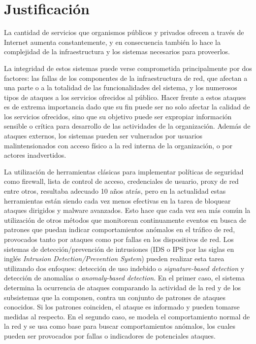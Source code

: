 \section*{Justificación}
La cantidad de servicios que organismos públicos y privados ofrecen a través de Internet aumenta constantemente, y en consecuencia también lo hace la complejidad de la infraestructura y los sistemas necesarios para proveerlos. \par
La integridad de estos sistemas puede verse comprometida principalmente por dos factores: las fallas de los componentes de la infraestructura de red\cite{Gill:2011:UNF:2043164.2018477}, que afectan a una parte o a la totalidad de las funcionalidades del sistema, y los numerosos tipos de ataques\cite{Karumanchi:2014:WLS:2554850.2555010}\cite{mutchler15:mobilewebapps} a los servicios ofrecidos al público. Hacer frente a estos ataques es de extrema importancia dado que su fin puede ser no solo afectar la calidad de los servicios ofrecidos, sino que su objetivo puede ser expropiar información sensible o crítica para desarrollo de las actividades de la organización. Además de ataques externos, los sistemas pueden ser vulnerados por usuarios malintensionados con acceso físico a la red interna de la organización, o por actores inadvertidos\cite{Kraemer2007143}\cite{Kraemer2009509}\cite{Liginlal2009215}\cite{Ahmed12humanerrors}. \par
La utilización de herramientas clásicas para implementar políticas de seguridad como firewall, lista de control de acceso, credenciales de usuario, proxy de red entre otros, resultaba adecuado 10 años atrás, pero en la actualidad estas herramientas están siendo cada vez menos efectivas en la tarea de bloquear ataques dirigidos y malware avanzados. Esto hace que cada vez sea más común la utilización de otros métodos que monitorean continuamente eventos en busca de patrones que puedan indicar comportamientos anómalos en el tráfico de red, provocados tanto por ataques como por fallas en los dispositivos de red. Los sistemas de detección/prevención de intrusiones (IDS o IPS por las siglas en inglés \textit{Intrusion Detection/Prevention System}) pueden realizar esta tarea utilizando dos enfoques: detección de uso indebido o \textit{signature-based detection} y detección de anomalías o \textit{anomaly-based detection}\cite{Milenkoski:2015:ECI:2808687.2808691}. En el primer caso, el sistema determina la ocurrencia de ataques comparando la actividad de la red y de los subsistemas que la componen, contra un conjunto de patrones de ataques conocidos. Si los patrones coinciden, el ataque es informado y pueden tomarse medidas al respecto. En el segundo caso, se modela el comportamiento normal de la red y se usa como base para buscar comportamientos anómalos, los cuales pueden ser provocados por fallas o indicadores de potenciales ataques. \par
